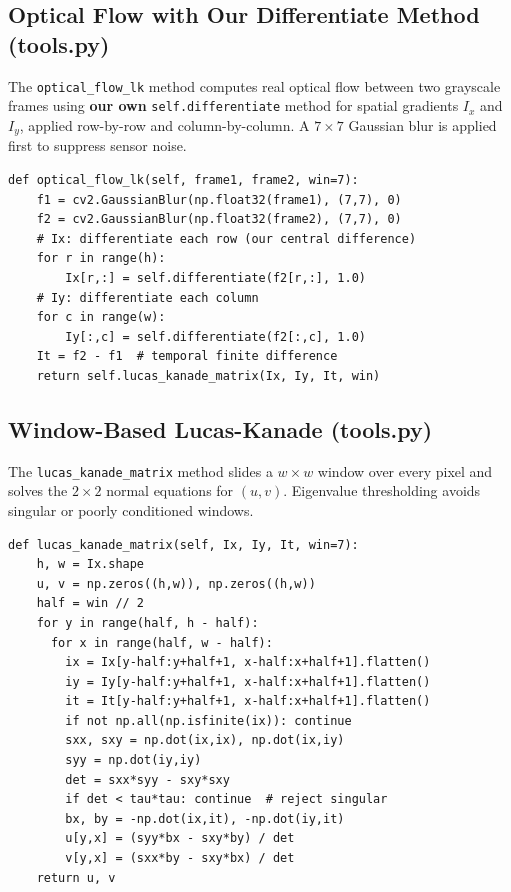 \documentclass[letterpaper,twocolumn,fleqn]{article}
\begin{document}
\subsection{Optical Flow with Our Differentiate Method (tools.py)}
The \texttt{optical\_flow\_lk} method computes real optical flow between two
grayscale frames using \textbf{our own} \texttt{self.differentiate} method
for spatial gradients $I_x$ and $I_y$, applied row-by-row and column-by-column.
A $7 \times 7$ Gaussian blur is applied first to suppress sensor noise.

\begin{lstlisting}
def optical_flow_lk(self, frame1, frame2, win=7):
    f1 = cv2.GaussianBlur(np.float32(frame1), (7,7), 0)
    f2 = cv2.GaussianBlur(np.float32(frame2), (7,7), 0)
    # Ix: differentiate each row (our central difference)
    for r in range(h):
        Ix[r,:] = self.differentiate(f2[r,:], 1.0)
    # Iy: differentiate each column
    for c in range(w):
        Iy[:,c] = self.differentiate(f2[:,c], 1.0)
    It = f2 - f1  # temporal finite difference
    return self.lucas_kanade_matrix(Ix, Iy, It, win)
\end{lstlisting}

\subsection{Window-Based Lucas-Kanade (tools.py)}
The \texttt{lucas\_kanade\_matrix} method slides a $w \times w$ window over
every pixel and solves the $2 \times 2$ normal equations for $(u, v)$.
Eigenvalue thresholding avoids singular or poorly conditioned windows.

\begin{lstlisting}
def lucas_kanade_matrix(self, Ix, Iy, It, win=7):
    h, w = Ix.shape
    u, v = np.zeros((h,w)), np.zeros((h,w))
    half = win // 2
    for y in range(half, h - half):
      for x in range(half, w - half):
        ix = Ix[y-half:y+half+1, x-half:x+half+1].flatten()
        iy = Iy[y-half:y+half+1, x-half:x+half+1].flatten()
        it = It[y-half:y+half+1, x-half:x+half+1].flatten()
        if not np.all(np.isfinite(ix)): continue
        sxx, sxy = np.dot(ix,ix), np.dot(ix,iy)
        syy = np.dot(iy,iy)
        det = sxx*syy - sxy*sxy
        if det < tau*tau: continue  # reject singular
        bx, by = -np.dot(ix,it), -np.dot(iy,it)
        u[y,x] = (syy*bx - sxy*by) / det
        v[y,x] = (sxx*by - sxy*bx) / det
    return u, v
\end{lstlisting}
\end{document}

